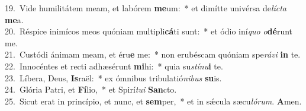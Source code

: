 {19.~}Vide humilitátem meam, et labórem \textbf{me}um:~* et dimítte univérsa de\textit{lí}\textit{cta} \textbf{me}a.\\
{20.~}Réspice inimícos meos quóniam multipli\textbf{cá}ti sunt:~* et ódio iní\textit{quo} \textit{o}\textbf{dé}runt me.\\
{21.~}Custódi ánimam meam, et éru\textbf{e} me:~* non erubéscam quóniam spe\textit{rá}\textit{vi} \textbf{in} te.\\
{22.~}Innocéntes et recti adhæsérunt \textbf{mi}hi:~* quia su\textit{stí}\textit{nu}\textbf{i} te.\\
{23.~}Líbera, Deus, \textbf{Is}raël:~* ex ómnibus tribulatió\textit{ni}\textit{bus} \textbf{su}is.\\
{24.~}Glória Patri, et \textbf{Fí}lio,~* et Spirí\textit{tu}\textit{i} \textbf{San}cto.\\
{25.~}Sicut erat in princípio, et nunc, et \textbf{sem}per,~* et in sǽcula sæcu\textit{ló}\textit{rum}. \textbf{A}men.\\
